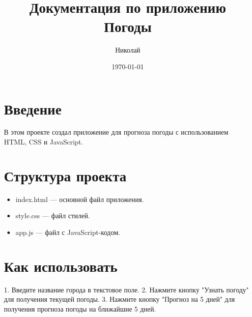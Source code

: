 \documentclass{article}
\title{Документация по приложению Погоды}
\author{Николай}
\date{\today}
\begin{document}
\maketitle

\section{Введение}
В этом проекте  создал приложение для прогноза погоды с использованием HTML, CSS и JavaScript.

\section{Структура проекта}
\begin{itemize}
    \item index.html — основной файл приложения.
    \item style.css — файл стилей.
    \item app.js — файл с JavaScript-кодом.
\end{itemize}

\section{Как использовать}
1. Введите название города в текстовое поле.
2. Нажмите кнопку "Узнать погоду" для получения текущей погоды.
3. Нажмите кнопку "Прогноз на 5 дней" для получения прогноза погоды на ближайшие 5 дней.
\end{document}
